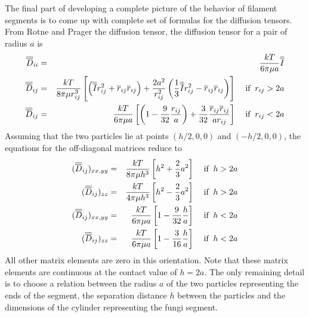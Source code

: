 \documentclass[12pt]{article}
\begin{document}
The final part of developing a complete picture of the behavior of filament
segments is to come up with complete set of formulas for the diffusion tensors.
From Rotne and Prager the diffusion tensor, the diffusion tensor for a pair of
radius $a$ is
\begin{eqnarray*}
\overline{\overline{D}}_{ii} & = & \frac{kT}{6\pi\mu a}\overline{\overline{I}} \\
\overline{\overline{D}}_{ij} & = & \frac{kT}{8\pi\mu r_{ij}^3}\left[\left(\overline{\overline{I}} r_{ij}^2 +\overline{r}_{ij}
\overline{r}_{ij}\right) +\frac{2a^2}{r_{ij}^2}\left(\frac{1}{3}\overline{\overline{I}} r_{ij}^2
-\overline{r}_{ij}\overline{r}_{ij}\right)\right] \;\;\;\; \mbox{if}\;\; r_{ij} > 2a \\
\overline{\overline{D}}_{ij} & = & \frac{kT}{6\pi\mu a}\left[\left(1-\frac{9}{32}\frac{r_{ij}}{a}\right)
+\frac{3}{32}\frac{\overline{r}_{ij}\overline{r}_{ij}}{ar_{ij}}\right] \;\;\;\; \mbox{if} \;\; r_{ij}<2a
\end{eqnarray*}
Assuming that the two particles lie at points $(h/2,0,0)$ and $(-h/2,0,0)$,
the equations for the off-diagonal matrices reduce to
\begin{eqnarray*}
(\overline{\overline{D}}_{ij})_{xx,yy} & = & \frac{kT}{8\pi\mu h^3}\left[h^2+\frac{2}{3}a^2\right]
 \;\;\;\;\mbox{if}\;\;h>2a \\
(\overline{\overline{D}}_{ij})_{zz} & = & \frac{kT}{4\pi\mu h^3}\left[h^2-\frac{2}{3}a^2\right]
 \;\;\;\;\mbox{if}\;\;h>2a \\
(\overline{\overline{D}}_{ij})_{xx,yy} & = & \frac{kT}{6\pi\mu a}\left[1-\frac{9}{32}\frac{h}{a}\right]
 \;\;\;\;\mbox{if}\;\;h<2a \\
(\overline{\overline{D}}_{ij})_{zz} & = & \frac{kT}{6\pi\mu a}\left[1-\frac{3}{16}\frac{h}{a}\right]
 \;\;\;\;\mbox{if}\;\;h<2a \\
\end{eqnarray*}
All other matrix elements are zero in this orientation. Note that these matrix
elements are continuous at the contact value of $h=2a$. The only remaining detail
is to choose a relation between the radius $a$ of the two particles representing
the ends of the segment, the separation distance $h$ between the particles and
the dimensions of the cylinder representing the fungi segment.
\end{document}
